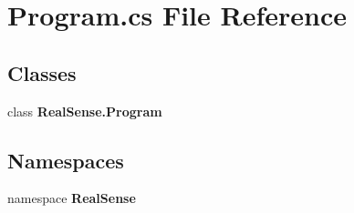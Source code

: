 \section{Program.\+cs File Reference}
\label{_program_8cs}
\subsection*{Classes}
\begin{DoxyCompactItemize}
\item 
class \textbf{ Real\+Sense.\+Program}
\end{DoxyCompactItemize}
\subsection*{Namespaces}
\begin{DoxyCompactItemize}
\item 
namespace \textbf{ Real\+Sense}
\end{DoxyCompactItemize}

